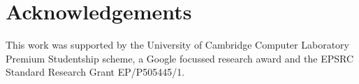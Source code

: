 \documentclass{sig-alternate}
\begin{document}
\section{Acknowledgements}
This work was supported by the University of Cambridge Computer Laboratory Premium Studentship scheme, a Google focussed research award and the EPSRC Standard Research Grant EP/P505445/1.

\printbibliography
\end{document}
